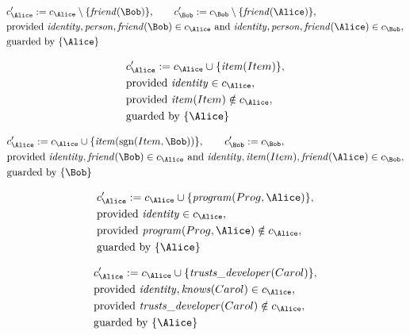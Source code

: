 \begin{align*}
&
c'_
{
\Alice
}
 := 
c_
{
\Alice
}
 \setminus 
\{
\mathit{\detokenize{
friend
}}
(
\Bob
)
\}
, \qquad 
c'_
{
\Bob
}
 := 
c_
{
\Bob
}
 \setminus 
\{
\mathit{\detokenize{
friend
}}
(
\Alice
)
\}
,\\
&
\text{provided } 
\mathit{\detokenize{
identity
}}
,
\mathit{\detokenize{
person
}}
,
\mathit{\detokenize{
friend
}}
(
\Bob
)
 \in c_
{
\Alice
}
 \text{ and } 
\mathit{\detokenize{
identity
}}
,
\mathit{\detokenize{
person
}}
,
\mathit{\detokenize{
friend
}}
(
\Alice
)
 \in c_
{
\Bob
}
,\\
&
\text{guarded by } \{
\Alice
\}
\end{align*}

\begin{align*}
&
c'_
{
\Alice
}
 := 
c_
{
\Alice
}
 \cup 
\{
\mathit{\detokenize{
item
}}
(
Item
)
\}
,\\
&
\text{provided } 
\mathit{\detokenize{
identity
}}
 \in c_
{
\Alice
}
,\\
&
\text{provided } 
\mathit{\detokenize{
item
}}
(
Item
)
 \notin c_
{
\Alice
}
,\\
&
\text{guarded by } \{
\Alice
\}
\end{align*}

\begin{align*}
&
c'_
{
\Alice
}
 := 
c_
{
\Alice
}
 \cup 
\{
\mathit{\detokenize{
item
}}
(
\mathrm{sgn}(
Item
,
\Bob
)
)
\}
, \qquad 
c'_
{
\Bob
}
 := 
c_
{
\Bob
}
,\\
&
\text{provided } 
\mathit{\detokenize{
identity
}}
,
\mathit{\detokenize{
friend
}}
(
\Bob
)
 \in c_
{
\Alice
}
 \text{ and } 
\mathit{\detokenize{
identity
}}
,
\mathit{\detokenize{
item
}}
(
Item
)
,
\mathit{\detokenize{
friend
}}
(
\Alice
)
 \in c_
{
\Bob
}
,\\
&
\text{guarded by } \{
\Bob
\}
\end{align*}

\begin{align*}
&
c'_
{
\Alice
}
 := 
c_
{
\Alice
}
 \cup 
\{
\mathit{\detokenize{
program
}}
(
Prog
,
\Alice
)
\}
,\\
&
\text{provided } 
\mathit{\detokenize{
identity
}}
 \in c_
{
\Alice
}
,\\
&
\text{provided } 
\mathit{\detokenize{
program
}}
(
Prog
,
\Alice
)
 \notin c_
{
\Alice
}
,\\
&
\text{guarded by } \{
\Alice
\}
\end{align*}

\begin{align*}
&
c'_
{
\Alice
}
 := 
c_
{
\Alice
}
 \cup 
\{
\mathit{\detokenize{
trusts_developer
}}
(
Carol
)
\}
,\\
&
\text{provided } 
\mathit{\detokenize{
identity
}}
,
\mathit{\detokenize{
knows
}}
(
Carol
)
 \in c_
{
\Alice
}
,\\
&
\text{provided } 
\mathit{\detokenize{
trusts_developer
}}
(
Carol
)
 \notin c_
{
\Alice
}
,\\
&
\text{guarded by } \{
\Alice
\}
\end{align*}
